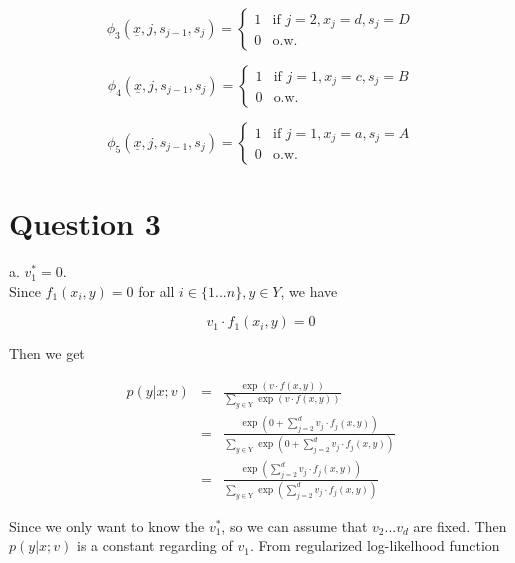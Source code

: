 \documentclass[12pt]{article}
\begin{document}
\begin{equation*}
\phi_3(\underline {x}, j, s_{j-1}, s_j) =
  \begin{cases}
    1 & \text{if } j = 2, x_j = d, s_j = D \\
    0 & \text{o.w.}
  \end{cases}
\end{equation*}

\begin{equation*}
\phi_4(\underline {x}, j, s_{j-1}, s_j) =
  \begin{cases}
    1 & \text{if } j = 1, x_j = c, s_j = B \\
    0 & \text{o.w.}
  \end{cases}
\end{equation*}

\begin{equation*}
\phi_5(\underline {x}, j, s_{j-1}, s_j) =
  \begin{cases}
    1 & \text{if } j = 1, x_j = a, s_j = A \\
    0 & \text{o.w.}
  \end{cases}
\end{equation*}

\section*{Question 3}

a. $v^*_1 = 0$. \\

Since $f_1(x_i,y) =0$  for all $i \in \{1...n\}, y \in Y$, we
have

\begin{equation*}
v_1 \cdot f_1(x_i,y) = 0
\end{equation*}

Then we get

\begin{eqnarray*}
p(y|x;v)
&=& \frac {\exp {(v \cdot f(x,y))}}
{\sum_{y \in \mathrm{Y}} {\exp {(v \cdot f(x,y))}}} \\
&=& \frac {\exp {(0 + \sum_{j=2}^d {v_j \cdot f_j(x,y)})}}
 {\sum_{y \in \mathrm{Y}} {\exp {(0 + \sum_{j=2}^d {v_j \cdot
         f_j(x,y)})}}} \\
&=& \frac {\exp {(\sum_{j=2}^d {v_j \cdot f_j(x,y)})}} {\sum_{y \in
    \mathrm{Y}} {\exp {(\sum_{j=2}^d {v_j \cdot f_j(x,y)})}}}
\end{eqnarray*}

Since we only want to know the $v_1^*$, so we can assume that
$v_2...v_d$ are fixed. Then $p(y|x;v)$ is a constant regarding of
$v_1$. From regularized log-likelhood function
\end{document}
